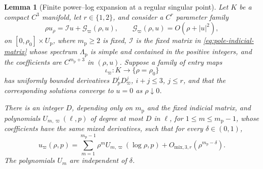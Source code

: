 \documentclass[11pt]{amsart}
\numberwithin{equation}{section}
\newtheorem{lemma}[theorem]{Lemma}
\theoremstyle{definition}
\theoremstyle{remark}
\begin{document}
\begin{lemma}[Finite power--log expansion at a regular singular point]
\label{lem:pole-power-log-expansion}
Let $K$ be a compact $C^3$ manifold, let $r\in\{1,2\}$, and consider a
$C^r$ parameter family
\begin{equation}\label{eq:abstract-regular-singular-equation}
\rho u_\rho=\mathcal Iu+\mathcal G_\varpi(\rho,u),
 \qquad \mathcal G_\varpi(\rho,u)=O(\rho+|u|^2),
\end{equation}
on $[0,\rho_0]\times U_{\mathrm p}$, where $m_{\mathrm p}\ge2$ is fixed,
$\mathcal I$ is the fixed matrix in \eqref{eq:pole-indicial-matrix} whose
spectrum $\Lambda_{\mathrm p}$ is simple and contained in the positive
integers, and the
coefficients are $C^{m_{\mathrm p}+3}$ in $(\rho,u)$.  Suppose a family of entry maps
\begin{equation}\label{eq:pole-entry-embedding}
 \iota_\varpi:K\longrightarrow\{\rho=\rho_0\}
\end{equation}
has uniformly bounded derivatives $D_p^iD_\varpi^j$, $i+j\le3$,
$j\le r$, and that the corresponding solutions converge to $u=0$ as
$\rho\downarrow0$.

There is an integer $D$, depending only on $m_{\mathrm p}$ and the fixed
indicial matrix, and polynomials $U_{m,\varpi}(\ell,p)$ of degree at most
$D$ in $\ell$, for $1\le m\le m_{\mathrm p}-1$, whose coefficients have
the same mixed derivatives, such
that for every $\delta\in(0,1)$,
\begin{equation}\label{eq:abstract-power-log-expansion}
 u_\varpi(\rho,p)
 =\sum_{m=1}^{m_{\mathrm p}-1}
    \rho^mU_{m,\varpi}(\log\rho,p)
  +O_{\mathrm{mix},3,r}(\rho^{m_{\mathrm p}-\delta}).
\end{equation}
The polynomials $U_m$ are independent of $\delta$.
\end{lemma}
\end{document}
